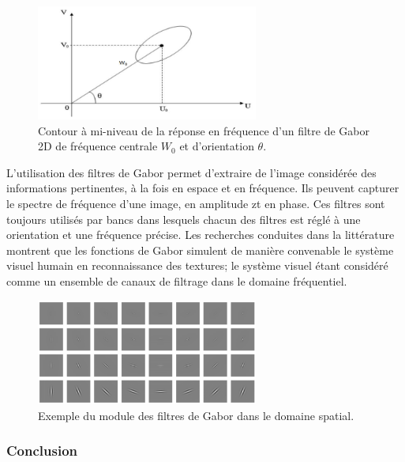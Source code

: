 \begin{figure}[H]
	\label{fig:gaborFig}
	\centering
	\includegraphics[width=0.65\textwidth]{Figures/gaborFig} %
	
	\caption{Contour à mi-niveau de la réponse en fréquence d’un filtre de Gabor 2D de fréquence centrale $W_0$ et d’orientation $\theta$.}
	
\end{figure}

L'utilisation des filtres de Gabor permet d'extraire de l'image considérée des informations pertinentes, à la fois en espace et en fréquence. Ils peuvent capturer le spectre de fréquence d'une image, en amplitude zt en phase. Ces filtres sont toujours utilisés par bancs dans lesquels chacun des filtres est réglé à une orientation et une fréquence précise. Les recherches conduites dans la littérature montrent que les fonctions de Gabor simulent de manière convenable le système visuel humain en reconnaissance des textures; le système visuel étant considéré comme un ensemble de canaux de filtrage dans le domaine fréquentiel.
 \begin{figure}[H]
 	\label{fig:gabor49}
 	\centering
 	\includegraphics[width=0.65\textwidth]{Figures/gabor49} %
 	
 	\caption{Exemple du module des filtres de Gabor dans le domaine spatial.}
 	
 \end{figure}
 
 
\subsubsection{Conclusion}

